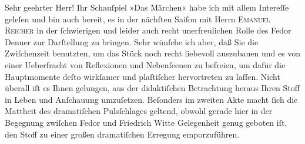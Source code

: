\pstart\center{}Sehr geehrter Herr!\pend\vspace{0.5em}
\pstart
           Ihr Schauſpiel »Das Märchen« habe ich mit allem
               Intereſſe geleſen und bin auch bereit, es in der nächſten Saiſon mit Herrn \textsc{Emanuel Reicher} in der ſchwierigen und leider auch recht unerfreulichen Rolle des Fedor Denner zur Darſtellung zu
               bringen. Sehr wünſche ich aber, daß Sie die Zwiſchenzeit benutzten, um das Stück noch
               recht liebevoll auszubauen und es von einer Ueberfracht von Reflexionen und
               Nebenſcenen zu befreien, um dafür die Hauptmomente deſto wirkſamer und plaſtiſcher
               hervortreten zu laſſen. Nicht überall iſt es Ihnen gelungen, aus der didaktiſchen
               Betrachtung heraus Ihren Stoff in Leben und Anſchauung umzuſetzen. Beſonders im
               zweiten Akte macht ſich die Mattheit des dramatiſchen Pulsſchlages geltend, obwohl
               gerade hier in der Begegnung zwiſchen Fedor und Friedrich Witte Gelegenheit genug geboten iſt, den Stoff zu einer großen
               dramatiſchen Erregung emporzuführen.\pend
           
